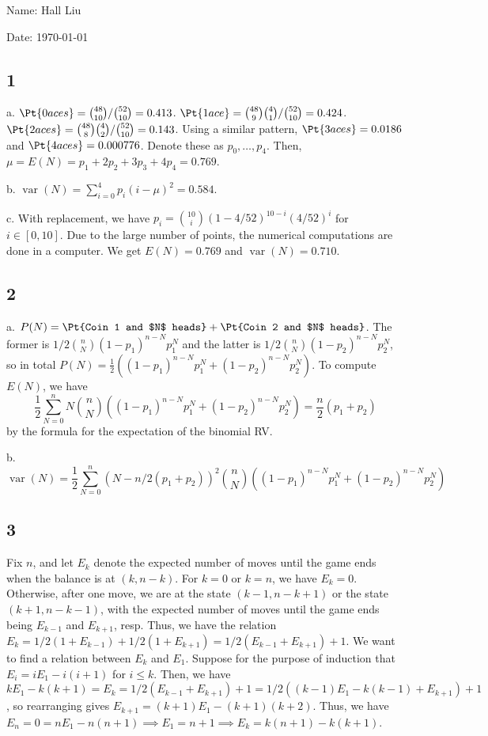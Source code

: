\documentclass{article}
\DeclareMathOperator{\var}{var}
\begin{document}
Name: Hall Liu

Date: \today 
\vspace{1.5cm}

\subsection*{1}
a. $\Pt{0 aces}=\binom{48}{10}/\binom{52}{10}=0.413$. $\Pt{1 ace}=\binom{48}{9}\binom{4}{1}/\binom{52}{10}=0.424$. $\Pt{2 aces}=\binom{48}{8}\binom{4}{2}/\binom{52}{10}=0.143$. Using a similar pattern, $\Pt{3 aces}=0.0186$ and $\Pt{4 aces}=0.000776$. Denote these as $p_0,\ldots,p_4$. Then, $\mu=E(N)=p_1+2p_2+3p_3+4p_4=0.769$.

b. $\var(N)=\sum_{i=0}^4p_i(i-\mu)^2=0.584$.

c. With replacement, we have $p_i=\binom{10}{i}(1-4/52)^{10-i}(4/52)^i$ for $i\in[0,10]$. Due to the large number of points, the numerical computations are done in a computer. We get $E(N)=0.769$ and $\var(N)=0.710$.
\subsection*{2}
a. $P(N)=\Pt{Coin 1 and $N$ heads}+\Pt{Coin 2 and $N$ heads}$. The former is $1/2\binom{n}{N}(1-p_1)^{n-N}p_1^N$ and the latter is $1/2\binom{n}{N}(1-p_2)^{n-N}p_2^N$, so in total $P(N)=\frac{1}{2}((1-p_1)^{n-N}p_1^N+(1-p_2)^{n-N}p_2^N)$. To compute $E(N)$, we have 
$$\frac{1}{2}\sum_{N=0}^nN\binom{n}{N}((1-p_1)^{n-N}p_1^N+(1-p_2)^{n-N}p_2^N)=\frac{n}{2}(p_1+p_2)$$
by the formula for the expectation of the binomial RV.

b. $$\var(N)=\frac{1}{2}\sum_{N=0}^n(N-n/2(p_1+p_2))^2\binom{n}{N}((1-p_1)^{n-N}p_1^N+(1-p_2)^{n-N}p_2^N)$$
\subsection*{3}
Fix $n$, and let $E_k$ denote the expected number of moves until the game ends when the balance is at $(k,n-k)$. For $k=0$ or $k=n$, we have $E_k=0$. Otherwise, after one move, we are at the state $(k-1,n-k+1)$ or the state $(k+1,n-k-1)$, with the expected number of moves until the game ends being $E_{k-1}$ and $E_{k+1}$, resp. Thus, we have the relation $E_k=1/2(1+E_{k-1})+1/2(1+E_{k+1})=1/2(E_{k-1}+E_{k+1})+1$. We want to find a relation between $E_k$ and $E_1$. Suppose for the purpose of induction that $E_i=iE_1-i(i+1)$ for $i\leq k$. Then, we have $kE_1-k(k+1)=E_k=1/2(E_{k-1}+E_{k+1})+1=1/2((k-1)E_1-k(k-1)+E_{k+1})+1$, so rearranging gives $E_{k+1}=(k+1)E_1-(k+1)(k+2)$. Thus, we have $E_n=0=nE_1-n(n+1)\implies E_1=n+1\implies E_k=k(n+1)-k(k+1)$.
\end{document}
